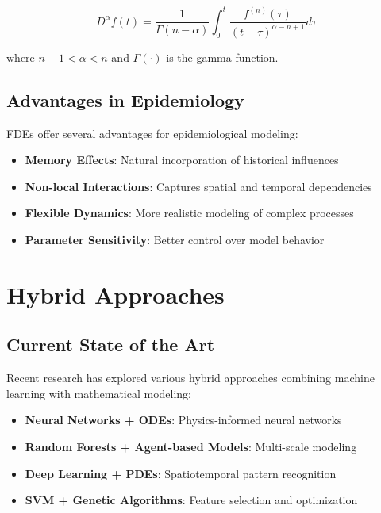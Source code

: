 \documentclass[12pt,a4paper]{report}
\begin{document}
\begin{equation}
D^\alpha f(t) = \frac{1}{\Gamma(n-\alpha)}\int_0^t \frac{f^{(n)}(\tau)}{(t-\tau)^{\alpha-n+1}}d\tau
\end{equation}

where $n-1 < \alpha < n$ and $\Gamma(\cdot)$ is the gamma function.

\subsection{Advantages in Epidemiology}

FDEs offer several advantages for epidemiological modeling:

\begin{itemize}
    \item \textbf{Memory Effects}: Natural incorporation of historical influences
    \item \textbf{Non-local Interactions}: Captures spatial and temporal dependencies
    \item \textbf{Flexible Dynamics}: More realistic modeling of complex processes
    \item \textbf{Parameter Sensitivity}: Better control over model behavior
\end{itemize}

\section{Hybrid Approaches}

\subsection{Current State of the Art}

Recent research has explored various hybrid approaches combining machine learning with mathematical modeling:

\begin{itemize}
    \item \textbf{Neural Networks + ODEs}: Physics-informed neural networks
    \item \textbf{Random Forests + Agent-based Models}: Multi-scale modeling
    \item \textbf{Deep Learning + PDEs}: Spatiotemporal pattern recognition
    \item \textbf{SVM + Genetic Algorithms}: Feature selection and optimization \autocite{fernandez_lozano_2013}
\end{itemize}
\end{document}
